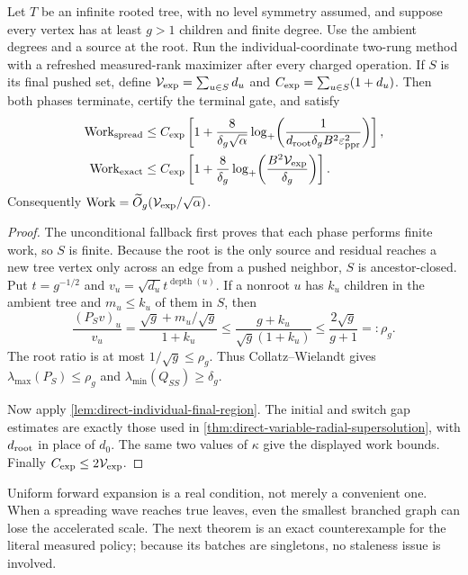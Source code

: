 \begin{theorem}
\label{thm:direct-nonsymmetric-expanding-tree}
Let $T$ be an infinite rooted tree, with no level symmetry assumed, and
suppose every vertex has at least $g>1$ children and finite degree.  Use the
ambient degrees and a source at the root.  Run the individual-coordinate
two-rung method with a refreshed measured-rank maximizer after every charged
operation.  If $S$ is its final pushed set, define
$\mathcal V_{\rm exp}=\sum_{u\in S}d_u$ and
$C_{\rm exp}=\sum_{u\in S}(1+d_u)$.  Then both phases terminate, certify the
terminal gate, and satisfy
\begin{align}
 \operatorname{Work}_{\rm spread}
 &\leq C_{\rm exp}\left[1+
 \frac{8}{\delta_g\sqrt\alpha}
 \log_+\!\left(
 \frac1{d_{\rm root}\delta_gB^2\varepsilon_{\mathrm{ppr}}^2}
 \right)\right],
 \label{eq:direct-nonsymmetric-spread-work}\\
 \operatorname{Work}_{\rm exact}
 &\leq C_{\rm exp}\left[1+
 \frac8{\delta_g}
 \log_+\!\left(
 \frac{B^2\mathcal V_{\rm exp}}{\delta_g}
 \right)\right].
 \label{eq:direct-nonsymmetric-exact-work}
\end{align}
Consequently
$\operatorname{Work}=\widetilde O_g(\mathcal V_{\rm exp}/\sqrt\alpha)$.
\end{theorem}

\begin{proof}
The unconditional fallback first proves that each phase performs finite work,
so $S$ is finite.  Because the root is the only source and residual reaches a
new tree vertex only across an edge from a pushed neighbor, $S$ is
ancestor-closed.  Put $t=g^{-1/2}$ and
$v_u=\sqrt{d_u}t^{\operatorname{depth}(u)}$.  If a nonroot $u$ has $k_u$
children in the ambient tree and $m_u\leq k_u$ of them in $S$, then
\begin{equation*}
 \frac{(P_Sv)_u}{v_u}
 =\frac{\sqrt g+m_u/\sqrt g}{1+k_u}
 \leq\frac{g+k_u}{\sqrt g(1+k_u)}
 \leq\frac{2\sqrt g}{g+1}=:\rho_g.
\end{equation*}
The root ratio is at most $1/\sqrt g\leq\rho_g$.  Thus
Collatz--Wielandt gives
$\lambda_{\max}(P_S)\leq\rho_g$ and
$\lambda_{\min}(Q_{SS})\geq\delta_g$.

Now apply \cref{lem:direct-individual-final-region}.  The initial and switch
gap estimates are exactly those used in
\cref{thm:direct-variable-radial-supersolution}, with $d_{\rm root}$ in
place of $d_0$.  The same two values of $\kappa$ give the displayed work
bounds.  Finally $C_{\rm exp}\leq2\mathcal V_{\rm exp}$.
\end{proof}

Uniform forward expansion is a real condition, not merely a convenient one.
When a spreading wave reaches true leaves, even the smallest branched graph
can lose the accelerated scale.  The next theorem is an exact counterexample
for the literal measured policy; because its batches are singletons, no
staleness issue is involved.
